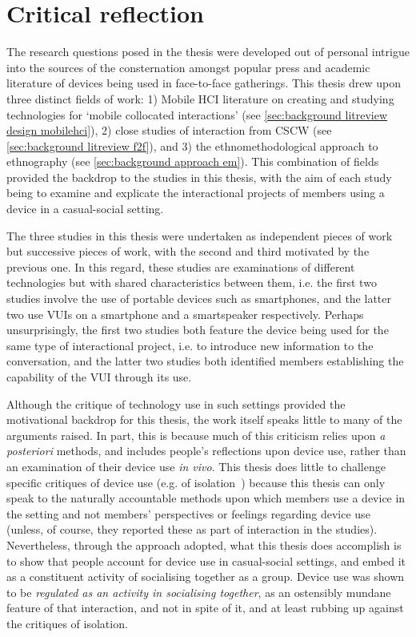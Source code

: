 \section{Critical reflection}\label{sec:synopsis conclusions reflection}
\begin{revisedsubmission}
The research questions posed in the thesis were developed out of personal intrigue into the sources of the consternation amongst popular press and academic literature of devices being used in face-to-face gatherings.
This thesis drew upon three distinct fields of work: 1) Mobile \ac{HCI} literature on creating and studying technologies for `mobile collocated interactions' (see \ref{sec:background litreview design mobilehci}), 2) close studies of interaction from \ac{CSCW} (see \ref{sec:background litreview f2f}), and 3) the ethnomethodological approach to ethnography (see \ref{sec:background approach em}).
This combination of fields provided the backdrop to the studies in this thesis, with the aim of each study being to examine and explicate the interactional projects of members using a device in a casual-social setting.

The three studies in this thesis were undertaken as independent pieces of work but successive pieces of work, with the second and third motivated by the previous one.
In this regard, these studies are examinations of different technologies but with shared characteristics between them, i.e. the first two studies involve the use of portable devices such as smartphones, and the latter two use \acp{VUI} on a smartphone and a smartspeaker respectively.
Perhaps unsurprisingly, the first two studies both feature the device being used for the same type of interactional project, i.e. to introduce new information to the conversation, and the latter two studies both identified members establishing the capability of the \ac{VUI} through its use.

Although the critique of technology use in such settings provided the motivational backdrop for this thesis, the work itself speaks little to many of the arguments raised.
In part, this is because much of this criticism relies upon \textit{a posteriori} methods, and includes people's reflections upon device use, rather than an examination of their device use \textit{in vivo}.
This thesis does little to challenge specific critiques of device use (e.g. of isolation~\citep{Turkle2011}) because this thesis can only speak to the naturally accountable methods upon which members use a device in the setting and not members' perspectives or feelings regarding device use (unless, of course, they reported these as part of interaction in the studies).
Nevertheless, through the approach adopted, what this thesis does accomplish is to show that people account for device use in casual-social settings, and embed it as a constituent activity of socialising together as a group.
Device use was shown to be \textit{regulated as an activity in socialising together}, as an ostensibly mundane feature of that interaction, and not in spite of it, and at least rubbing up against the critiques of isolation.
\end{revisedsubmission}



